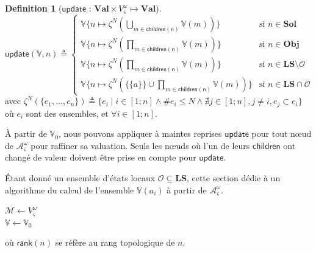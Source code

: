 \documentclass[11pt]{report}
\theoremstyle{definition}
\newtheorem{Def}{Definition}[chapter]
\begin{document}
\begin{Def}[$\mathsf{update}$ : $\mathbf{Val}\times V^\omega_\varsigma\mapsto\mathbf{Val}$]
$$\mathsf{update}(\mathbb{V},n)\triangleq 
\begin{cases}
\mathbb{V}\{n\mapsto\zeta^N(\bigcup_{m\in \mathsf{children(n)}}\mathbb{V}(m))\}&\text{si }n\in\mathbf{Sol}\\
            \mathbb{V}\{n\mapsto\zeta^N({\prod_{m\in \mathsf{children(n)}}}\mathbb{V}(m))\}&\text{si }n\in\mathbf{Obj}\\
            \mathbb{V}\{n\mapsto\zeta^N({\prod_{m\in \mathsf{children(n)}}}\mathbb{V}(m))\}&\text{si }n\in\mathbf{LS}\setminus\mathcal{O}\\
            \mathbb{V}\{n\mapsto\zeta^N(\{\{a\}\}\cup{\prod_{m\in \mathsf{children(n)}}}\mathbb{V}(m))\}&\text{si }n\in\mathbf{LS}\cap\mathcal{O}
\end{cases}
$$
avec $\zeta^N(\{e_1,\ldots,e_n\})\triangleq\{e_i\mid i\in[1;n]\land\#e_i\leq N\land\nexists j\in[1;n],j\neq i,e_j\subset e_i\}$ o\`u $e_i$ sont des ensembles, et $\forall i\in[1;n]$.
\end{Def}
\`A partir de $\mathbb{V}_0$, nous pouvons appliquer \`a maintes reprises $\mathsf{update}$ pour tout n\oe ud de $\mathcal{A}^\omega_\varsigma$ pour raffiner sa valuation. Seuls les n\oe uds o\`u l'un de leurs $\mathsf{children}$ ont chang\'e de valeur
doivent \^etre prise en compte pour $\mathsf{update}$.

\'Etant donn\'e un ensemble d'\'etats locaux $\mathcal{O}\subseteq\mathbf{LS}$, cette section d\'edie \`a un algorithme du calcul de l'ensemble $\mathbb{V}(a_i)$  \`a partir de $\mathcal{A}^\omega_\varsigma$.\\
\begin{algorithm}[ht]\label{algocut}
$\mathcal{M}\gets V^\omega_\varsigma$\\
$\mathbb{V}\gets\mathbb{V}_0$\\
\end{algorithm}
o\`u $\mathsf{rank}(n)$ se r\'ef\`ere au rang topologique de $n$.
\end{document}
